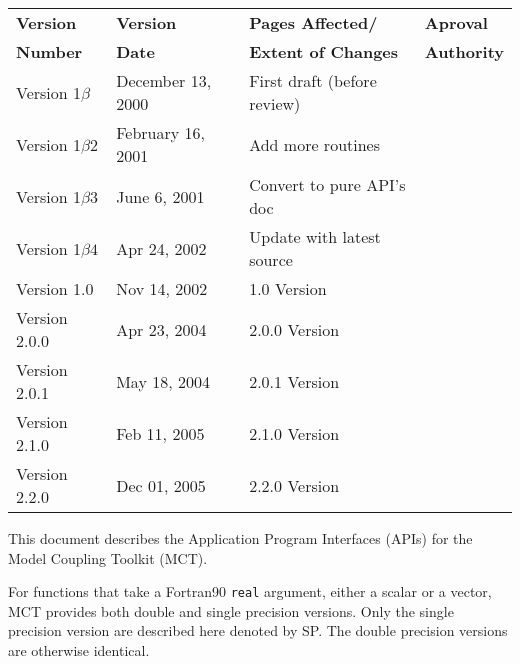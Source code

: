 \documentclass{article}
\begin{document}
\begin{center}
\begin{tabular}{|l|l|l|l|}\hline
{\bf Version} & {\bf Version} & {\bf Pages Affected/}   & {\bf Aproval}\\
{\bf Number}  & {\bf Date}    & {\bf Extent of Changes} & {\bf Authority}\\
\hline
\hline 
Version 1$\beta$ & December 13, 2000      & First draft (before review) &
\\\hline
Version 1$\beta2$ & February 16, 2001      & Add more routines &
\\\hline
Version 1$\beta3$ & June 6, 2001      & Convert to pure API's doc &
\\\hline
Version 1$\beta4$ & Apr 24, 2002      & Update with latest source &
\\\hline
Version 1.0 & Nov 14, 2002      & 1.0 Version &
\\\hline
Version 2.0.0 & Apr 23, 2004      & 2.0.0 Version &
\\\hline
Version 2.0.1 & May 18, 2004      & 2.0.1 Version &
\\\hline
Version 2.1.0 & Feb 11, 2005      & 2.1.0 Version &
\\\hline
Version 2.2.0 & Dec 01, 2005      & 2.2.0 Version &
\\\hline
\end{tabular}
\end{center}

\vspace*{\fill}


\newpage
\setcounter{page}{3}     %

\vspace*{\fill}

This document describes the Application Program Interfaces (APIs)
for the Model Coupling Toolkit (MCT).

For functions that take a Fortran90 {\tt real} argument, either a scalar or
a vector, MCT provides both double and single precision versions.  Only
the single precision version are described here denoted by SP.  The double precision versions
are otherwise identical.

\vspace*{\fill}
\newpage

\tableofcontents
\newpage

\end{document}
